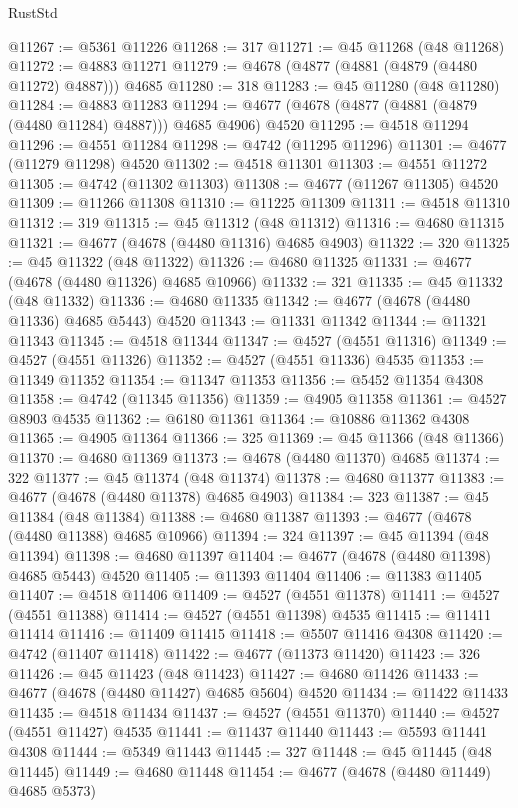 \begin{lexlean}{RustStd}
\begin{coremodule}
@11267 := @5361 @11226
@11268 := 317
@11271 := @45 @11268 (@48 @11268)
@11272 := @4883 @11271
@11279 := @4678 (@4877 (@4881 (@4879 (@4480 @11272) @4887))) @4685
@11280 := 318
@11283 := @45 @11280 (@48 @11280)
@11284 := @4883 @11283
@11294 := @4677 (@4678 (@4877 (@4881 (@4879 (@4480 @11284) @4887))) @4685 @4906) @4520
@11295 := @4518 @11294
@11296 := @4551 @11284
@11298 := @4742 (@11295 @11296)
@11301 := @4677 (@11279 @11298) @4520
@11302 := @4518 @11301
@11303 := @4551 @11272
@11305 := @4742 (@11302 @11303)
@11308 := @4677 (@11267 @11305) @4520
@11309 := @11266 @11308
@11310 := @11225 @11309
@11311 := @4518 @11310
@11312 := 319
@11315 := @45 @11312 (@48 @11312)
@11316 := @4680 @11315
@11321 := @4677 (@4678 (@4480 @11316) @4685 @4903)
@11322 := 320
@11325 := @45 @11322 (@48 @11322)
@11326 := @4680 @11325
@11331 := @4677 (@4678 (@4480 @11326) @4685 @10966)
@11332 := 321
@11335 := @45 @11332 (@48 @11332)
@11336 := @4680 @11335
@11342 := @4677 (@4678 (@4480 @11336) @4685 @5443) @4520
@11343 := @11331 @11342
@11344 := @11321 @11343
@11345 := @4518 @11344
@11347 := @4527 (@4551 @11316)
@11349 := @4527 (@4551 @11326)
@11352 := @4527 (@4551 @11336) @4535
@11353 := @11349 @11352
@11354 := @11347 @11353
@11356 := @5452 @11354 @4308
@11358 := @4742 (@11345 @11356)
@11359 := @4905 @11358
@11361 := @4527 @8903 @4535
@11362 := @6180 @11361
@11364 := @10886 @11362 @4308
@11365 := @4905 @11364
@11366 := 325
@11369 := @45 @11366 (@48 @11366)
@11370 := @4680 @11369
@11373 := @4678 (@4480 @11370) @4685
@11374 := 322
@11377 := @45 @11374 (@48 @11374)
@11378 := @4680 @11377
@11383 := @4677 (@4678 (@4480 @11378) @4685 @4903)
@11384 := 323
@11387 := @45 @11384 (@48 @11384)
@11388 := @4680 @11387
@11393 := @4677 (@4678 (@4480 @11388) @4685 @10966)
@11394 := 324
@11397 := @45 @11394 (@48 @11394)
@11398 := @4680 @11397
@11404 := @4677 (@4678 (@4480 @11398) @4685 @5443) @4520
@11405 := @11393 @11404
@11406 := @11383 @11405
@11407 := @4518 @11406
@11409 := @4527 (@4551 @11378)
@11411 := @4527 (@4551 @11388)
@11414 := @4527 (@4551 @11398) @4535
@11415 := @11411 @11414
@11416 := @11409 @11415
@11418 := @5507 @11416 @4308
@11420 := @4742 (@11407 @11418)
@11422 := @4677 (@11373 @11420)
@11423 := 326
@11426 := @45 @11423 (@48 @11423)
@11427 := @4680 @11426
@11433 := @4677 (@4678 (@4480 @11427) @4685 @5604) @4520
@11434 := @11422 @11433
@11435 := @4518 @11434
@11437 := @4527 (@4551 @11370)
@11440 := @4527 (@4551 @11427) @4535
@11441 := @11437 @11440
@11443 := @5593 @11441 @4308
@11444 := @5349 @11443
@11445 := 327
@11448 := @45 @11445 (@48 @11445)
@11449 := @4680 @11448
@11454 := @4677 (@4678 (@4480 @11449) @4685 @5373)

\end{coremodule}
\end{lexlean}
